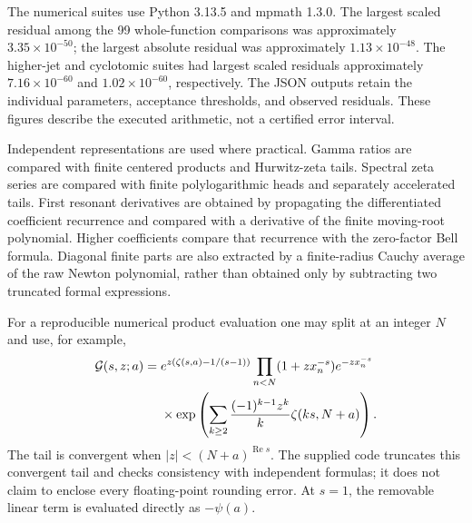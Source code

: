 \documentclass[11pt]{article}
\numberwithin{equation}{section}
\theoremstyle{definition}\newtheorem{definition}[theorem]{Definition}
\theoremstyle{remark}\newtheorem{remark}[theorem]{Remark}
\DeclareMathOperator{\Rea}{Re}
\newcommand{\G}{\mathcal G}\newcommand{\F}{\mathfrak F}
\begin{document}
The numerical suites use Python 3.13.5 and mpmath 1.3.0. The largest scaled
residual among the 99 whole-function comparisons was approximately
$3.35\times10^{-50}$; the largest absolute residual was approximately
$1.13\times10^{-48}$. The higher-jet and cyclotomic suites had largest scaled
residuals approximately $7.16\times10^{-60}$ and $1.02\times10^{-60}$,
respectively. The JSON outputs retain the individual parameters, acceptance
thresholds, and observed residuals. These figures describe the executed
arithmetic, not a certified error interval.

Independent representations are used where practical. Gamma ratios are
compared with finite centered products and Hurwitz-zeta tails. Spectral
zeta series are compared with finite polylogarithmic heads and separately
accelerated tails. First resonant derivatives are obtained by propagating
the differentiated coefficient recurrence and compared with a derivative
of the finite moving-root polynomial. Higher coefficients compare that
recurrence with the zero-factor Bell formula. Diagonal finite parts are
also extracted by a finite-radius Cauchy average of the raw Newton
polynomial, rather than obtained only by subtracting two truncated formal
expressions.

For a reproducible numerical product evaluation one may split at an integer
$N$ and use, for example,
\begin{align}
 \G(s,z;a)={}&e^{z(\zeta(s,a)-1/(s-1))}
 \prod_{n<N}(1+zx_n^{-s})e^{-zx_n^{-s}}\notag\\
 &\times\exp\left(\sum_{k\ge2}
         \frac{(-1)^{k-1}z^k}{k}\zeta(ks,N+a)\right).
 \label{eq:evaluation}
\end{align}
The tail is convergent when $|z|<(N+a)^{\Rea s}$. The supplied code truncates
this convergent tail and checks consistency with independent formulas;
it does not claim to enclose every floating-point rounding error.
At $s=1$, the removable linear term is evaluated directly as $-\psi(a)$.
\end{document}
